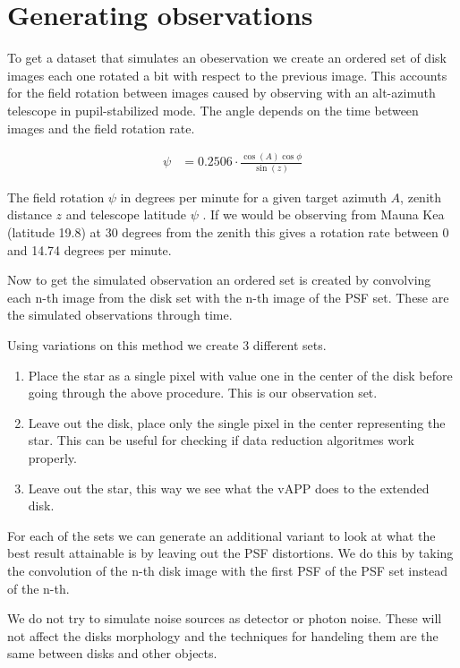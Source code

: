 





\section{Generating observations}
\label{sec:gen}
To get a dataset that simulates an obeservation we create an ordered set of disk images each one rotated a bit with respect to the previous image. This accounts for the field rotation between images caused by observing with an alt-azimuth telescope in pupil-stabilized mode. The angle depends on the time between images and the field rotation rate.

\begin{align}
  \psi &= 0.2506 \cdot \frac{\cos(A) \cos \phi}{\sin(z)} 
\end{align}

The field rotation $\psi$ in degrees per minute for a given target azimuth $A$, zenith distance $z$ and telescope latitude $\psi$ \cite[page 95]{Electronic_imaging}. If we would be observing from Mauna Kea (latitude 19.8) at 30 degrees from the zenith this gives a rotation rate between 0 and 14.74 degrees per minute.%

Now to get the simulated observation an ordered set is created by convolving each n-th image from the disk set with the n-th image of the  \ac{PSF}  set. These are the simulated observations through time. 

Using variations on this method we create 3 different sets.

\begin{enumerate}
\item Place the star as a single pixel with value one in the center of the disk before going through the above procedure. This is our observation set.
\item Leave out the disk, place only the single pixel in the center representing the star. This can be useful for checking if data reduction algoritmes work properly.
\item Leave out the star, this way we see what the \ac{vAPP} does to the extended disk.
\end{enumerate}

For each of the sets we can generate an additional variant to look at what the best result attainable is by leaving out the  \ac{PSF}  distortions. We do this by taking the convolution of the n-th disk image with the first \ac{PSF} of the \ac{PSF} set instead of the n-th.

We do not try to simulate noise sources as detector or photon noise. These will not affect the disks morphology and the techniques for handeling them are the same between disks and other objects.
